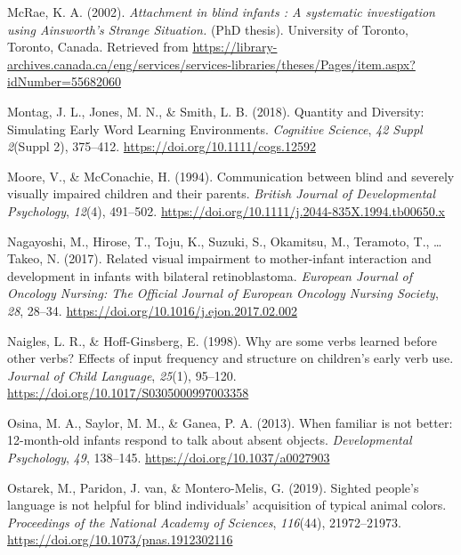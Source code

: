 \documentclass[
  man]{apa6}
\newlength{\cslhangindent}
\newlength{\cslentryspacingunit} %
\newenvironment{CSLReferences}[2] %
 {%
  \setlength{\parindent}{0pt}
  \ifodd #1
  \let\oldpar\par
  \def\par{\hangindent=\cslhangindent\oldpar}
  \fi
  \setlength{\parskip}{#2\cslentryspacingunit}
 }%
 {}
\begin{document}
\begin{CSLReferences}{1}{0}
\leavevmode{}%
McRae, K. A. (2002). \emph{Attachment in blind infants : A systematic investigation using {Ainsworth}'s {Strange} {Situation}.} (PhD thesis). University of Toronto, Toronto, Canada. Retrieved from \url{https://library-archives.canada.ca/eng/services/services-libraries/theses/Pages/item.aspx?idNumber=55682060}

\leavevmode{}%
Montag, J. L., Jones, M. N., \& Smith, L. B. (2018). Quantity and {Diversity}: {Simulating} {Early} {Word} {Learning} {Environments}. \emph{Cognitive Science}, \emph{42 Suppl 2}(Suppl 2), 375--412. \url{https://doi.org/10.1111/cogs.12592}

\leavevmode{}%
Moore, V., \& McConachie, H. (1994). Communication between blind and severely visually impaired children and their parents. \emph{British Journal of Developmental Psychology}, \emph{12}(4), 491--502. \url{https://doi.org/10.1111/j.2044-835X.1994.tb00650.x}

\leavevmode{}%
Nagayoshi, M., Hirose, T., Toju, K., Suzuki, S., Okamitsu, M., Teramoto, T., \ldots{} Takeo, N. (2017). Related visual impairment to mother-infant interaction and development in infants with bilateral retinoblastoma. \emph{European Journal of Oncology Nursing: The Official Journal of European Oncology Nursing Society}, \emph{28}, 28--34. \url{https://doi.org/10.1016/j.ejon.2017.02.002}

\leavevmode{}%
Naigles, L. R., \& Hoff-Ginsberg, E. (1998). Why are some verbs learned before other verbs? {Effects} of input frequency and structure on children's early verb use. \emph{Journal of Child Language}, \emph{25}(1), 95--120. \url{https://doi.org/10.1017/S0305000997003358}

\leavevmode{}%
Osina, M. A., Saylor, M. M., \& Ganea, P. A. (2013). When familiar is not better: 12-month-old infants respond to talk about absent objects. \emph{Developmental Psychology}, \emph{49}, 138--145. \url{https://doi.org/10.1037/a0027903}

\leavevmode{}%
Ostarek, M., Paridon, J. van, \& Montero-Melis, G. (2019). Sighted people's language is not helpful for blind individuals' acquisition of typical animal colors. \emph{Proceedings of the National Academy of Sciences}, \emph{116}(44), 21972--21973. \url{https://doi.org/10.1073/pnas.1912302116}


\end{CSLReferences}
\end{document}
